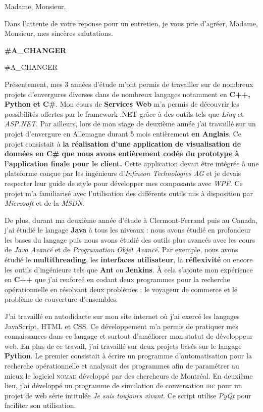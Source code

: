 \date{\today}
\opening{Madame, Monsieur,}
\closing{Dans l'attente de votre réponse pour un entretien, je vous prie d'agréer, Madame, Monsieur, mes sincères salutations.}

\makelettertitle

\textbf{#A_CHANGER}

\introduction{}
#A_CHANGER

Présentement, mes 3 années d'étude m'ont permis de travailler sur de nombreux projets d'envergures diverses dans de nombreux langages notamment en \textbf{C++, Python et C\#}. Mon cours de \textbf{Services Web} m'a permis de découvrir les possibilités offertes par le framework .NET grâce à des outils tels que \textit{Linq} et \textit{ASP.NET}. Par ailleurs, lors de mon stage de deuxième année j'ai travaillé sur un projet d'envergure en Allemagne durant 5 mois entièrement \textbf{en Anglais}. Ce projet consistait à \textbf{la réalisation d'une application de visualisation de données en C\# que nous avons entièrement codée du prototype à l'application finale pour le client.} Cette application devait être intégrée à une plateforme conçue par les ingénieurs d'\textit{Infineon Technologies AG} et je devais respecter leur guide de style pour développer mes composants avec \textit{WPF}. Ce projet m'a familiarisé avec l'utilisation des différents outils mis à disposition par \textit{Microsoft} et de la \textit{MSDN}.

De plus, durant ma deuxième année d'étude à Clermont-Ferrand puis au Canada, j'ai étudié le langage \textbf{Java} à tous les niveaux : nous avons étudié en profondeur les bases du langage puis nous avons étudié des outils plus avancés avec les cours de \textit{Java Avancé} et de \textit{Programation Objet Avancé}. Par exemple, nous avons étudié le \textbf{multithreading}, les \textbf{interfaces utilisateur}, la \textbf{réflexivité} ou encore les outils d'ingénieure tels que \textbf{Ant} ou \textbf{Jenkins}. À cela s'ajoute mon expérience en \textbf{C++} que j'ai renforcé en codant deux programmes pour la recherche opérationnelle en résolvant deux problèmes : le voyageur de commerce et le problème de couverture d'ensembles. 

J'ai travaillé en autodidacte sur mon site internet où j'ai exercé les langages JavaScript, HTML et CSS. Ce développement m'a permis de pratiquer mes connaissances dans ce langage et surtout d'améliorer mon statut de développeur web. En plus de ce travail, j'ai travaillé sur deux projets basés sur le langage \textbf{Python}. Le premier consistait à écrire un programme d'automatisation pour la recherche opérationnelle et analysait des programmes afin de paramétrer au mieux le logiciel \textsc{nomad} développé par des chercheurs de Montréal. En deuxième lieu, j'ai développé un programme de simulation de conversation \textsc{irc} pour un projet de web série intitulée \textit{Je suis toujours vivant}. Ce script utilise \textit{PyQt} pour faciliter son utilisation. \conclusion{}

\makeletterclosing
